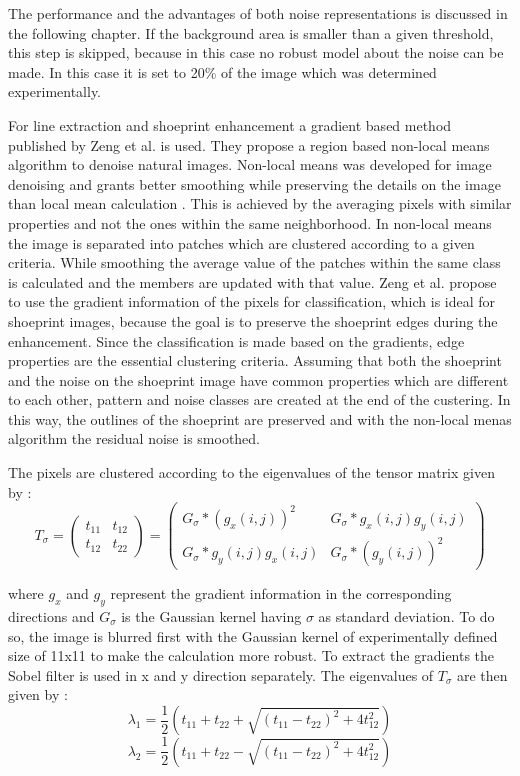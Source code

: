 \documentclass[draft,final]{vutinfth} %
\begin{document}
The performance and the advantages of both noise representations is discussed in the following chapter.
If the background area is smaller than a given threshold, this step is skipped, because in this case no robust model about the noise can be made.
In this case it is set to 20\% of the image which was determined experimentally.
\par
For line extraction and shoeprint enhancement a gradient based method published by Zeng et al. \cite{zeng2011region} is used.
They propose a region based non-local means algorithm to denoise natural images.
Non-local means was developed for image denoising and grants better smoothing while preserving the details on the image than local mean calculation \cite{buades2005non}.
This is achieved by the averaging pixels with similar properties and not the ones within the same neighborhood.
In non-local means the image is separated into patches which are clustered according to a given criteria.
While smoothing the average value of the patches within the same class is calculated and the members are updated with that value.
Zeng et al. \cite{zeng2011region} propose to use the gradient information of the pixels for classification, which is ideal for shoeprint images, because the goal is to preserve the shoeprint edges during the enhancement.
Since the classification is made based on the gradients, edge properties are the essential clustering criteria.
Assuming that both the shoeprint and the noise on the shoeprint image have common properties which are different to each other, pattern and noise classes are created at the end of the custering.
In this way, the outlines of the shoeprint are preserved and with the non-local menas algorithm the residual noise is smoothed.
\par 
The pixels are clustered according to the eigenvalues of the tensor matrix given by \cite{zeng2011region}:
\[T_\sigma = 
\begin{pmatrix}
t_{11} & t_{12} \\
t_{12} & t_{22}
\end{pmatrix}
=
\begin{pmatrix}
G_\sigma*(g_x(i,j))^2 & G_{\sigma}*g_x(i, j)g_y(i, j)\\
G_{\sigma}*g_y(i, j)g_x(i, j) & G_{\sigma}*(g_y(i, j))^2
\end{pmatrix}
\]

where $g_x$ and $g_y$ represent the gradient information in the corresponding directions and $G_\sigma$ is the Gaussian kernel having $\sigma$ as standard deviation.
To do so, the image is blurred first with the Gaussian kernel of experimentally defined size of 11x11 to make the calculation more robust.
To extract the gradients the Sobel filter is used in x and y direction separately.
The eigenvalues of $T_\sigma$ are then given by \cite{zeng2011region}:
\[\lambda_1 = \frac{1}{2}(t_{11} + t_{22} + \sqrt{(t_{11}-t_{22})^2 + 4t_{12}^2})\]  
\[\lambda_2 = \frac{1}{2}(t_{11} + t_{22} - \sqrt{(t_{11}-t_{22})^2 + 4t_{12}^2})\]  
\label{eig}
\end{document}
